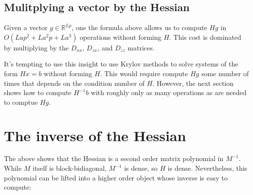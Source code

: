 \documentclass{article}
\begin{document}
\subsection{Mulitplying a vector by the Hessian}

Given a vector $g \in \mathbb{R}^{Lp}$, one the formula above allows us to
compute $H g$ in $O\left(Lap^2 + L a^2p +La^3\right)$ operations without
forming $H$. This cost is dominated by multiplying by the $D_{xx}$, $D_{zx}$,
and $D_{zz}$ matrices.

It's tempting to use this insight to use Krylov methods to solve systems of the
form $H x = b$ without forming $H$. This would require compute $H g$ some
number of times that depends on the condition number of $H$. However, the next
section shows how to compute $H^{-1} b$ with roughly only as many operations as
are needed to comptue $H g$.

\section{The inverse of the Hessian}

The above shows that the Hessian is a second order matrix polynomial in
$M^{-1}$. While $M$ itself is block-bidiagonal, $M^{-1}$ is dense, so $H$ is
dense. Nevertheless, this polynomial can be lifted into a higher order object
whose inverse is easy to compute:
\end{document}
